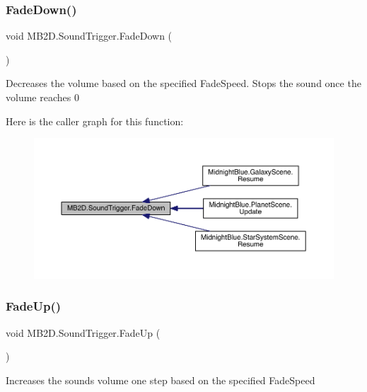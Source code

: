 \subsubsection{\texorpdfstring{Fade\+Down()}{FadeDown()}}
{\footnotesize\ttfamily void M\+B2\+D.\+Sound\+Trigger.\+Fade\+Down (\begin{DoxyParamCaption}{ }\end{DoxyParamCaption})\hspace{0.3cm}{\ttfamily [inline]}}



Decreases the volume based on the specified Fade\+Speed. Stops the sound once the volume reaches 0 

Here is the caller graph for this function\+:
\nopagebreak
\begin{figure}[H]
\begin{center}
\leavevmode
\includegraphics[width=350pt]{class_m_b2_d_1_1_sound_trigger_aca40e191ef7b6cd594d43bb36ae787e9_icgraph}
\end{center}
\end{figure}
\hypertarget{class_m_b2_d_1_1_sound_trigger_a677d10464891b21b44da3811430d5bea}{}\label{class_m_b2_d_1_1_sound_trigger_a677d10464891b21b44da3811430d5bea} 
\subsubsection{\texorpdfstring{Fade\+Up()}{FadeUp()}}
{\footnotesize\ttfamily void M\+B2\+D.\+Sound\+Trigger.\+Fade\+Up (\begin{DoxyParamCaption}{ }\end{DoxyParamCaption})\hspace{0.3cm}{\ttfamily [inline]}}



Increases the sounds volume one step based on the specified Fade\+Speed 

